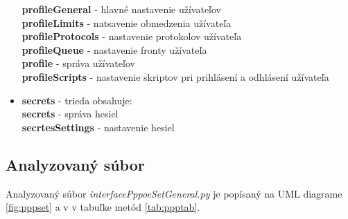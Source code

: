 \begin{itemize}
\textbf{profileGeneral} - hlavné nastavenie užívateľov\\
\textbf{profileLimits} - natsavenie obmedzenia užívateľa\\
\textbf{profileProtocols} - nastavenie protokolov užívateľa\\
\textbf{profileQueue} - nastavenie fronty užívateľa\\
\textbf{profile} - správa užívateľov\\
\textbf{profileScripts} - nastavenie skriptov pri prihlásení a odhlásení užívateľa
\item \textbf{secrets} - trieda obsahuje:\\
\textbf{secrets} - správa hesiel\\
\textbf{secrtesSettings} - nastavenie hesiel
\end{itemize}
\subsection{Analyzovaný súbor}
Analyzovaný súbor \textit{interfacePppoeSetGeneral.py} je popísaný na UML diagrame \ref{fig:pppset} a v v tabuľke metód \ref{tab:ppptab}.
\begin{table}[H]
\centering
{}
\caption{Tabuľka popisu metód triedy interfacePppoeGeneralSet}
\label{tab:ppptab}
\end{table}
